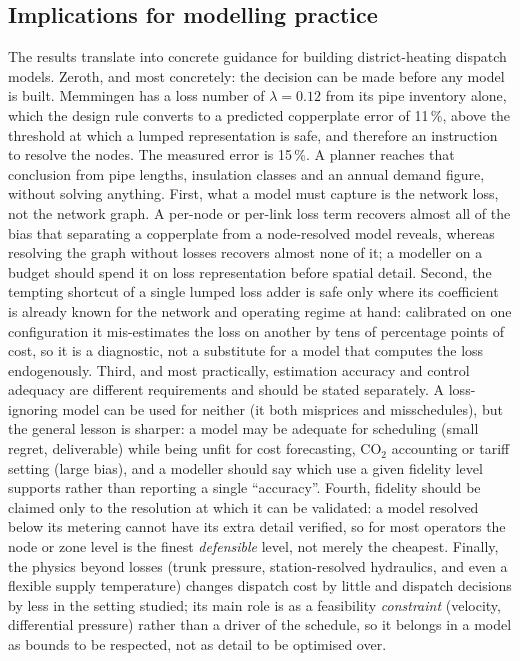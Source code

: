 \documentclass[a4paper,fleqn]{cas-sc}
\begin{document}
\subsection{Implications for modelling practice}
The results translate into concrete guidance for building district-heating dispatch models.
Zeroth, and most concretely: the decision can be made before any model is built. Memmingen has a loss number of $\lambda=0.12$ from its pipe inventory alone, which the design rule converts to a predicted copperplate error of 11\,\%, above the threshold at which a lumped representation is safe, and therefore an instruction to resolve the nodes. The measured error is 15\,\%. A planner reaches that conclusion from pipe lengths, insulation classes and an annual demand figure, without solving anything. First, what a model must capture is the network loss, not the network graph. A per-node or
per-link loss term recovers almost all of the bias that separating a copperplate from a
node-resolved model reveals, whereas resolving the graph without losses recovers almost none
of it; a modeller on a budget should spend it on loss representation before spatial detail.
Second, the tempting shortcut of a single lumped loss adder is safe only where its coefficient
is already known for the network and operating regime at hand: calibrated on one configuration
it mis-estimates the loss on another by tens of percentage points of cost, so it is a
diagnostic, not a substitute for a model that computes the loss endogenously. Third, and most
practically, estimation accuracy and control adequacy are different requirements and should be
stated separately. A loss-ignoring model can be used for neither (it both misprices and
misschedules), but the general lesson is sharper: a model may be adequate for scheduling
(small regret, deliverable) while being unfit for cost forecasting, CO$_2$ accounting or tariff
setting (large bias), and a modeller should say which use a given fidelity level supports rather
than reporting a single ``accuracy''. Fourth, fidelity should be claimed only to the resolution
at which it can be validated: a model resolved below its metering cannot have its extra detail
verified, so for most operators the node or zone level is the finest \emph{defensible} level,
not merely the cheapest. Finally, the physics beyond losses (trunk pressure, station-resolved
hydraulics, and even a flexible supply temperature) changes dispatch cost by little and
dispatch decisions by less in the setting studied; its main role is as a feasibility
\emph{constraint} (velocity, differential pressure) rather than a driver of the schedule, so it
belongs in a model as bounds to be respected, not as detail to be optimised over.

\end{document}
